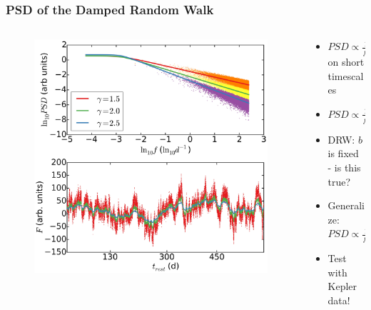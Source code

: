 \documentclass[hyperref={pdfpagelabels=false}]{beamer}
\begin{document}
\begin{frame}
\frametitle{PSD of the Damped Random Walk}
  \begin{columns}
    \centering
    \begin{column}{0.5\textwidth}
    \centering
      \begin{figure}
        \includegraphics[scale=0.09]{images/DRW.jpg}
      \end{figure}
    \end{column}
    \begin{column}{0.5\textwidth}
    \begin{itemize}
    \item $PSD \propto \frac{1}{f^{2}}$ on short timescales
    \item $PSD \propto \frac{1}{f^{b}} \Rightarrow \sigma_{\alpha-fluc} \propto r^{b}$ {\tiny \citep{Lyubarskii97}}
    \item DRW: $b$ is fixed - is this true?
    \item Generalize: $PSD \propto \frac{1}{f^{\gamma}}$ {\tiny \citep{McHardy04}}
    \item Test with Kepler data!
    \end{itemize}
    \end{column}
  \end{columns}
\end{frame}
\end{document}
